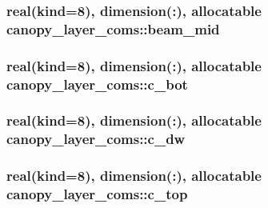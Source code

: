 \subsubsection[{\texorpdfstring{beam\+\_\+mid}{beam_mid}}]{\setlength{\rightskip}{0pt plus 5cm}real(kind=8), dimension(\+:), allocatable canopy\+\_\+layer\+\_\+coms\+::beam\+\_\+mid}\hypertarget{namespacecanopy__layer__coms_a3e967ac0256075263e0833a70ec74b48}{}\label{namespacecanopy__layer__coms_a3e967ac0256075263e0833a70ec74b48}
\subsubsection[{\texorpdfstring{c\+\_\+bot}{c_bot}}]{\setlength{\rightskip}{0pt plus 5cm}real(kind=8), dimension(\+:), allocatable canopy\+\_\+layer\+\_\+coms\+::c\+\_\+bot}\hypertarget{namespacecanopy__layer__coms_aa62cf8de84772d0d7f4985ccd01ad4c1}{}\label{namespacecanopy__layer__coms_aa62cf8de84772d0d7f4985ccd01ad4c1}
\subsubsection[{\texorpdfstring{c\+\_\+dw}{c_dw}}]{\setlength{\rightskip}{0pt plus 5cm}real(kind=8), dimension(\+:), allocatable canopy\+\_\+layer\+\_\+coms\+::c\+\_\+dw}\hypertarget{namespacecanopy__layer__coms_ad0bcaad69c487152e827bca2f683297b}{}\label{namespacecanopy__layer__coms_ad0bcaad69c487152e827bca2f683297b}
\subsubsection[{\texorpdfstring{c\+\_\+top}{c_top}}]{\setlength{\rightskip}{0pt plus 5cm}real(kind=8), dimension(\+:), allocatable canopy\+\_\+layer\+\_\+coms\+::c\+\_\+top}\hypertarget{namespacecanopy__layer__coms_a83e6e25d502c4ff6f389c2d353645e5d}{}\label{namespacecanopy__layer__coms_a83e6e25d502c4ff6f389c2d353645e5d}
